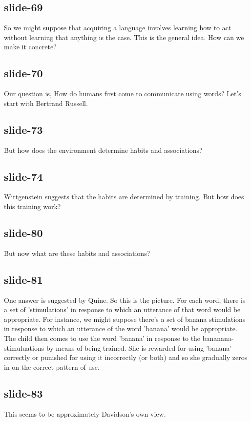 \documentclass[12pt,\papersize]{extarticle}
\begin{document}
 
\subsection{slide-69}
So we might suppose that acquiring a language involves learning how to act without learning that anything is the case.
This is the general idea. How can we make it concrete?
 
 
\subsection{slide-70}
Our question is, How do humans first come to communicate using words?
Let's start with Bertrand Russell.
 
 
\subsection{slide-73}
But how does the environment determine habits and associations?
 
 
\subsection{slide-74}
Wittgenstein suggests that the habits are determined by training.
But how does this training work?
 
 
\subsection{slide-80}
But now what are these habits and associations?
 
 
\subsection{slide-81}
One answer is suggested by Quine.
So this is the picture.
For each word, there is a set of 'stimulations' in response to which an utterance of that word would be appropriate.
For instance, we might suppose there's a set of banana stimulations in response to which an utterance of the word 'banana' would be appropriate.
The child then comes to use the word 'banana' in response to the bananana-stimuluations by means of being trained.
She is rewarded for using 'banana' correctly or punished for using it incorrectly (or both) and so she gradually zeros in on the correct pattern of use.
 
 
\subsection{slide-83}
This seems to be approximately Davidson's own view.
 
\end{document}

